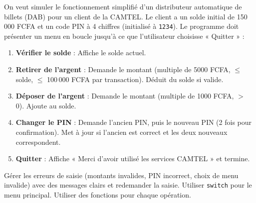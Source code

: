 \documentclass[11pt]{article}
\begin{document}
\begin{exercice}
On veut simuler le fonctionnement simplifié d'un distributeur automatique de billets (DAB) pour un client de la CAMTEL. Le client a un solde initial de 150\,000 FCFA et un code PIN à 4 chiffres (initialisé à \texttt{1234}).
Le programme doit présenter un menu en boucle jusqu'à ce que l'utilisateur choisisse « Quitter » :
\begin{enumerate}
    \item \textbf{Vérifier le solde} : Affiche le solde actuel.
    \item \textbf{Retirer de l'argent} : Demande le montant (multiple de 5000 FCFA, $\le$ solde, $\le$ 100\,000 FCFA par transaction). Déduit du solde si valide.
    \item \textbf{Déposer de l'argent} : Demande le montant (multiple de 1000 FCFA, $>$ 0). Ajoute au solde.
    \item \textbf{Changer le PIN} : Demande l'ancien PIN, puis le nouveau PIN (2 fois pour confirmation). Met à jour si l'ancien est correct et les deux nouveaux correspondent.
    \item \textbf{Quitter} : Affiche « Merci d'avoir utilisé les services CAMTEL » et termine.
\end{enumerate}
Gérer les erreurs de saisie (montants invalides, PIN incorrect, choix de menu invalide) avec des messages clairs et redemander la saisie. Utiliser \texttt{switch} pour le menu principal. Utiliser des fonctions pour chaque opération.
\end{exercice}
\end{document}
